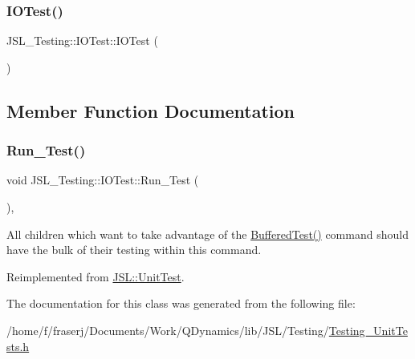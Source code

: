 \subsubsection{\texorpdfstring{I\+O\+Test()}{IOTest()}}
{\footnotesize\ttfamily J\+S\+L\+\_\+\+Testing\+::\+I\+O\+Test\+::\+I\+O\+Test (\begin{DoxyParamCaption}{ }\end{DoxyParamCaption})\hspace{0.3cm}{\ttfamily [inline]}}



\subsection{Member Function Documentation}
\mbox{\label{classJSL__Testing_1_1IOTest_a85daecacc71354b5dc0dee36840b8704}} 
\subsubsection{\texorpdfstring{Run\+\_\+\+Test()}{Run\_Test()}}
{\footnotesize\ttfamily void J\+S\+L\+\_\+\+Testing\+::\+I\+O\+Test\+::\+Run\+\_\+\+Test (\begin{DoxyParamCaption}{ }\end{DoxyParamCaption})\hspace{0.3cm}{\ttfamily [inline]}, {\ttfamily [virtual]}}



All children which want to take advantage of the \hyperlink{classJSL_1_1UnitTest_aabec19b081be8a428f12e4b5e3dc2a9c}{Buffered\+Test()} command should have the bulk of their testing within this command. 



Reimplemented from \hyperlink{classJSL_1_1UnitTest_aa8369ab1ce2a537bff2ea7e1c8818490}{J\+S\+L\+::\+Unit\+Test}.



The documentation for this class was generated from the following file\+:\begin{DoxyCompactItemize}
\item 
/home/f/fraserj/\+Documents/\+Work/\+Q\+Dynamics/lib/\+J\+S\+L/\+Testing/\hyperlink{Testing__UnitTests_8h}{Testing\+\_\+\+Unit\+Tests.\+h}\end{DoxyCompactItemize}

